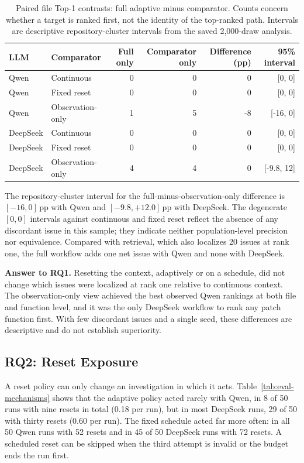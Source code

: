 \documentclass[a4paper,fleqn]{cas-sc}
\begin{document}
\begin{table}[pos=!htbp]
\caption{Paired file Top-1 contrasts: full adaptive minus comparator. Counts concern whether a target is ranked first, not the identity of the top-ranked path. Intervals are descriptive repository-cluster intervals from the saved 2,000-draw analysis.}\label{tab:paired}
\centering\small
\begin{tabular*}{\textwidth}{@{\extracolsep{\fill}}llrrrr@{}}\toprule
LLM & Comparator & Full only & Comparator only & Difference (pp) & 95\% interval\\\midrule
Qwen & Continuous & 0 & 0 & 0 & [0, 0]\\
Qwen & Fixed reset & 0 & 0 & 0 & [0, 0]\\
Qwen & Observation-only & 1 & 5 & -8 & [-16, 0]\\
DeepSeek & Continuous & 0 & 0 & 0 & [0, 0]\\
DeepSeek & Fixed reset & 0 & 0 & 0 & [0, 0]\\
DeepSeek & Observation-only & 4 & 4 & 0 & [-9.8, 12]\\
\bottomrule\end{tabular*}
\end{table}

The repository-cluster interval for the full-minus-observation-only difference is $[-16,0]$\,pp with Qwen and $[-9.8,+12.0]$\,pp with DeepSeek. The degenerate $[0,0]$ intervals against continuous and fixed reset reflect the absence of any discordant issue in this sample; they indicate neither population-level precision nor equivalence. Compared with retrieval, which also localizes 20 issues at rank one, the full workflow adds one net issue with Qwen and none with DeepSeek.

\noindent\textbf{Answer to RQ1.} Resetting the context, adaptively or on a schedule, did not change which issues were localized at rank one relative to continuous context. The observation-only view achieved the best observed Qwen rankings at both file and function level, and it was the only DeepSeek workflow to rank any patch function first. With few discordant issues and a single seed, these differences are descriptive and do not establish superiority.

\subsection{RQ2: Reset Exposure}\label{sec:rq2}
A reset policy can only change an investigation in which it acts. Table~\ref{tab:eval-mechanisms} shows that the adaptive policy acted rarely with Qwen, in 8 of 50 runs with nine resets in total (0.18 per run), but in most DeepSeek runs, 29 of 50 with thirty resets (0.60 per run). The fixed schedule acted far more often: in all 50 Qwen runs with 52 resets and in 45 of 50 DeepSeek runs with 72 resets. A scheduled reset can be skipped when the third attempt is invalid or the budget ends the run first.
\end{document}
